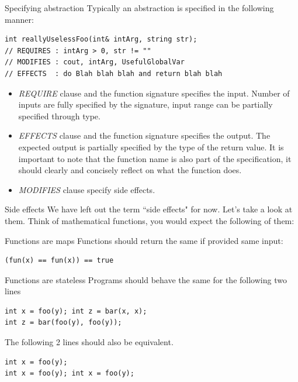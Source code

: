 \begin{frame}[fragile]{Specifying abstraction}
Typically an abstraction is specified in the following manner:
\begin{verbatim}
int reallyUselessFoo(int& intArg, string str);
// REQUIRES : intArg > 0, str != ""
// MODIFIES : cout, intArg, UsefulGlobalVar
// EFFECTS  : do Blah blah blah and return blah blah
\end{verbatim}
\begin{itemize}
	\item \textit{REQUIRE} clause and the function signature specifies the input. Number of inputs are fully specified by the signature, input range can be partially specified through type. 
	\item \textit{EFFECTS} clause and the function signature specifies  the output. The expected output is partially specified by the type of the return value. It is important to note that the function name is also part of the specification, it should clearly and concisely reflect on what the function does. 
	\item \textit{MODIFIES} clause specify side effects.
\end{itemize}
\end{frame}

\begin{frame}[fragile]{Side effects}
We have left out the term ``side effects" for now. Let's take a look at them. Think of mathematical functions, you would expect the following of them:
\begin{block}{Functions are maps}
Functions should return the same if provided same input:
\begin{verbatim}
(fun(x) == fun(x)) == true
\end{verbatim}

\end{block}
\begin{block}{Functions are stateless}
Programs should behave the same for the following two lines
\begin{verbatim}
int x = foo(y); int z = bar(x, x);
int z = bar(foo(y), foo(y));
\end{verbatim}

The following 2 lines should also be equivalent.
\begin{verbatim}
int x = foo(y); 
int x = foo(y); int x = foo(y);
\end{verbatim}

\end{block}
\end{frame}

